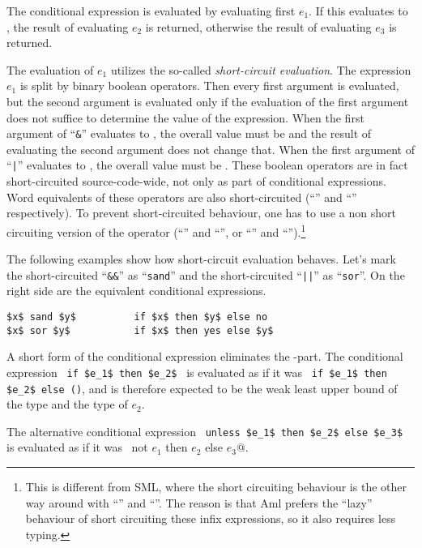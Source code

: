 The conditional expression is evaluated by evaluating first $e_1$. If this evaluates to , the result of evaluating $e_2$ is returned, otherwise the result of evaluating $e_3$ is returned. 

The evaluation of $e_1$ utilizes the so-called {\em short-circuit evaluation}. The expression $e_1$ is split by binary boolean operators. Then every first argument is evaluated, but the second argument is evaluated only if the evaluation of the first argument does not suffice to determine the value of the expression. When the first argument of ``\lstinline!&!'' evaluates to , the overall value must be  and the result of evaluating the second argument does not change that. When the first argument of ``\lstinline!|!'' evaluates to , the overall value must be . These boolean operators are in fact short-circuited source-code-wide, not only as part of conditional expressions. Word equivalents of these operators are also short-circuited (``'' and ``'' respectively). To prevent short-circuited behaviour, one has to use a non short circuiting version of the operator (``'' and ``'', or ``\code{&&}'' and ``\code{||}'').\footnote{This is different from SML, where the short circuiting behaviour is the other way around with ``'' and ``''. The reason is that Aml prefers the ``lazy'' behaviour of short circuiting these infix expressions, so it also requires less typing.}

\example The following examples show how short-circuit evaluation behaves. Let's mark the short-circuited ``\lstinline!&&!'' as ``\lstinline!sand!'' and the short-circuited ``\lstinline!||!'' as ``\lstinline!sor!''. On the right side are the equivalent conditional expressions. 
\begin{lstlisting}
$x$ sand $y$          if $x$ then $y$ else no
$x$ sor $y$           if $x$ then yes else $y$
\end{lstlisting}

A short form of the conditional expression eliminates the -part. The conditional expression ~\lstinline!if $e_1$ then $e_2$!~ is evaluated as if it was ~\lstinline!if $e_1$ then $e_2$ else ()!, and is therefore expected to be the weak least upper bound of the type  and the type of $e_2$. 

The alternative conditional expression ~\lstinline!unless $e_1$ then $e_2$ else $e_3$!~ is evaluated as if it was ~\lstinline@if not $e_1$ then $e_2$ else $e_3$@. 

